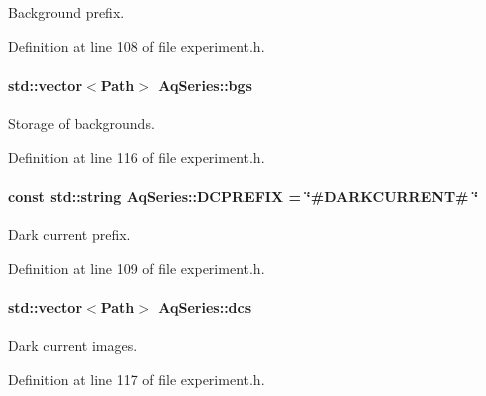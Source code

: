 Background prefix. 



Definition at line 108 of file experiment.h.

\hypertarget{classAqSeries_a49dccec360698a87334cede488149b31}{
\paragraph[{bgs}]{\setlength{\rightskip}{0pt plus 5cm}std::vector$<${\bf Path}$>$ {\bf AqSeries::bgs}}\hfill}
\label{classAqSeries_a49dccec360698a87334cede488149b31}


Storage of backgrounds. 



Definition at line 116 of file experiment.h.

\hypertarget{classAqSeries_a9174813ea5229d0b21bff04794baf499}{
\paragraph[{DCPREFIX}]{\setlength{\rightskip}{0pt plus 5cm}const std::string {\bf AqSeries::DCPREFIX} = \char`\"{}\#DARKCURRENT\# \char`\"{}}\hfill}
\label{classAqSeries_a9174813ea5229d0b21bff04794baf499}


Dark current prefix. 



Definition at line 109 of file experiment.h.

\hypertarget{classAqSeries_a95036605b8b21a8e71b56959b171a0e7}{
\paragraph[{dcs}]{\setlength{\rightskip}{0pt plus 5cm}std::vector$<${\bf Path}$>$ {\bf AqSeries::dcs}}\hfill}
\label{classAqSeries_a95036605b8b21a8e71b56959b171a0e7}


Dark current images. 



Definition at line 117 of file experiment.h.

